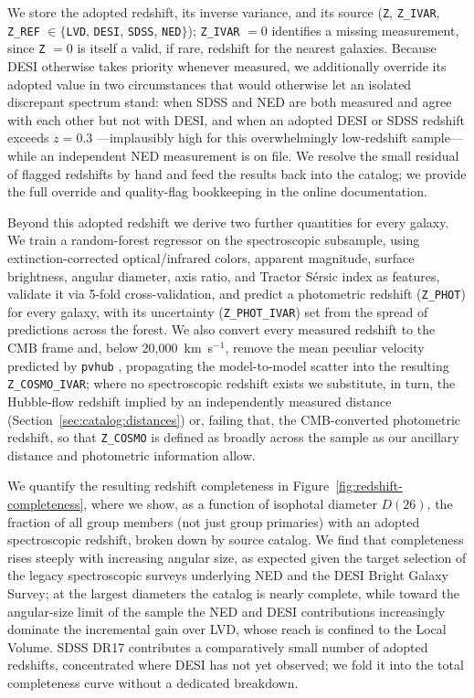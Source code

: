 \documentclass[modern,linenumbers]{aastex701}
\begin{document}
We store the adopted redshift, its inverse variance, and its source
(\texttt{Z}, \texttt{Z\_IVAR}, \texttt{Z\_REF} $\in \{$\texttt{LVD},
\texttt{DESI}, \texttt{SDSS}, \texttt{NED}$\}$); \texttt{Z\_IVAR} $= 0$
identifies a missing measurement, since \texttt{Z} $= 0$ is itself a valid,
if rare, redshift for the nearest galaxies. Because DESI otherwise takes
priority whenever measured, we additionally override its adopted value in
two circumstances that would otherwise let an isolated discrepant spectrum
stand: when SDSS and NED are both measured and agree with each other but
not with DESI, and when an adopted DESI or SDSS redshift exceeds $z = 0.3$
---implausibly high for this overwhelmingly low-redshift sample---while
an independent NED measurement is on file. We resolve the small residual
of flagged redshifts by hand and feed the results back into the catalog; we
provide the full override and quality-flag bookkeeping in the online
documentation.

Beyond this adopted redshift we derive two further quantities for every
galaxy. We train a random-forest regressor \citep[\texttt{scikit-learn};]
[]{pedregosa11a} on the spectroscopic subsample, using extinction-corrected
optical/infrared colors, apparent magnitude, surface brightness, angular
diameter, axis ratio, and Tractor S\'ersic index as features, validate it
via 5-fold cross-validation, and predict a photometric redshift
(\texttt{Z\_PHOT}) for every galaxy, with its uncertainty
(\texttt{Z\_PHOT\_IVAR}) set from the spread of predictions across the
forest. We also convert every measured redshift to the CMB frame and,
below 20,000~km~s$^{-1}$, remove the mean peculiar velocity predicted by
\texttt{pvhub} \citep{said20a}, propagating the model-to-model scatter into
the resulting \texttt{Z\_COSMO\_IVAR}; where no spectroscopic redshift
exists we substitute, in turn, the Hubble-flow redshift implied by an
independently measured distance (Section~\ref{sec:catalog:distances}) or,
failing that, the CMB-converted photometric redshift, so that
\texttt{Z\_COSMO} is defined as broadly across the sample as our ancillary
distance and photometric information allow.

We quantify the resulting redshift completeness in
Figure~\ref{fig:redshift-completeness}, where we show, as a function of
isophotal diameter $D(26)$, the fraction of all group members (not just
group primaries) with an adopted spectroscopic redshift, broken down by
source catalog. We find that completeness rises steeply with increasing
angular size, as expected given the target selection of the legacy
spectroscopic surveys underlying NED and the DESI Bright Galaxy Survey;
at the largest diameters the catalog is nearly complete, while toward the
angular-size limit of the sample the NED and DESI contributions
increasingly dominate the incremental gain over LVD, whose reach is
confined to the Local Volume. SDSS DR17 contributes a comparatively small
number of adopted redshifts, concentrated where DESI has not yet observed;
we fold it into the total completeness curve without a dedicated
breakdown.
\end{document}
